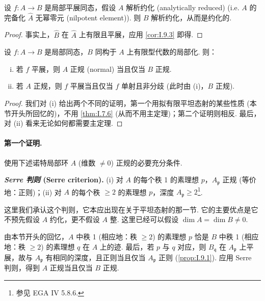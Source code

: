 \begin{corollary}\label{cor:I.9.4}
设 $f \colon A \to B$ 是局部平展同态，假设 $A$ 解析约化 (analytically reduced) (i.e. $A$ 的完备化 $\widehat{A}$ 无幂零元 (nilpotent element)). 则 $B$ 解析约化，从而是约化的.
\end{corollary}

\begin{proof}
事实上，$\widehat{B}$ 在 $\widehat{A}$ 上有限且平展，应用 \ref{cor:I.9.3} 即得.
\end{proof}

\begin{theorem}\label{thm:I.9.5}
设 $f \colon A \to B$ 是局部同态，$B$ 同构于 $A$ 上有限型代数的局部化. 则：
\begin{enumerate}[(i)]
\item 若 $f$ 平展，则 $A$ 正规 (normal) 当且仅当 $B$ 正规.
\item 若 $A$ 正规，则 $f$ 平展当且仅当 $f$ 单射且非分歧 (此时由 (i)，$B$ 正规).
\end{enumerate}
\end{theorem}

\begin{proof}
我们对 (i) 给出两个不同的证明，第一个用拟有限平坦态射的某些性质 (本节开头所回忆的)，不用 \ref{thm:I.7.6} (从而不用主定理)；第二个证明则相反. 最后，对 (ii) 看来无论如何都需要主定理.
\end{proof}

\paragraph*{第一个证明.} 使用下述诺特局部环 $A$ (维数 $\neq 0$) 正规的必要充分条件.

\begin{remarkstar}
\textbf{\emph{Serre 判则} (Serre criterion).} (i) 对 $A$ 的每个秩 1 的素理想 $p$，$A_{\mathfrak{p}}$ 正规 (等价地：正则)；(ii) 对 $A$ 的每个秩 $\geqslant 2$ 的素理想 $p$，深度 $A_{\mathfrak{p}} \geqslant 2$\footnote{参见 EGA IV 5.8.6.}.
\end{remarkstar}

这里我们承认这个判则，它本应出现在关于平坦态射的那一节. 它的主要优点是它不预先假设 $A$ 约化，更不假设 $A$ 整. 这里已经可以假设 $\dim A = \dim B \neq 0$.

由本节开头的回忆，$A$ 中秩 1 (相应地：秩 $\geqslant 2$) 的素理想 $p$ 恰是 $B$ 中秩 1 (相应地：秩 $\geqslant 2$) 的素理想 $q$ 在 $A$ 上的迹. 最后，若 $p$ 与 $q$ 对应，则 $B_{\mathfrak{q}}$ 在 $A_{\mathfrak{p}}$ 上平展，故与 $A_{\mathfrak{p}}$ 有相同的深度，且正则当且仅当 $A_{\mathfrak{p}}$ 正则 (\cref{prop:I.9.1}). 应用 Serre 判则，得到 $A$ 正规当且仅当 $B$ 正规.

